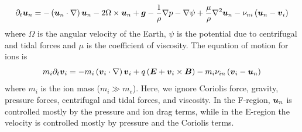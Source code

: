 \begin{equation*}
    \partial_{t}\boldsymbol{u}_n=-\left(\boldsymbol{u}_n\cdot\nabla\right)\boldsymbol{u}_n-2\Omega\times\boldsymbol{u}_n+\boldsymbol{g}-\frac{1}{\rho}\nabla p-\nabla\psi+\frac{\mu}{\rho}\nabla^2\boldsymbol{u}_n-\nu_{ni}\left(\boldsymbol{u}_n-\boldsymbol{v}_i\right)
\end{equation*}
where \(\Omega \) is the angular velocity of the Earth, \(\psi \) is the potential due to centrifugal and tidal forces and \(\mu \) is the coefficient of viscosity. The equation of motion for ions is
\begin{equation*}
    m_i\partial_{t}\boldsymbol{v}_i=-m_i\left(\boldsymbol{v}_i\cdot\nabla\right)\boldsymbol{v}_i+q\left(\boldsymbol{E}+\boldsymbol{v}_i\times\boldsymbol{B}\right)-m_i\nu_{in}\left(\boldsymbol{v}_i-\boldsymbol{u}_n\right)
\end{equation*}
where \(m_i\) is the ion mass (\(m_i\gg m_e\)). Here, we ignore Coriolis force, gravity, pressure forces, centrifugal and tidal forces, and viscosity. In the F-region, \(\boldsymbol{u}_n\) is controlled mostly by the pressure and ion drag terms, while in the E-region the velocity is controlled mostly by pressure and the Coriolis terms.


